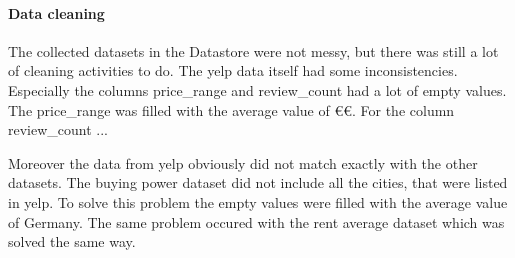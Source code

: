\paragraph{Data cleaning}
\label{subsec:Data cleaning}
The collected datasets in the Datastore were not messy, but there was still a lot of cleaning activities to do. The yelp data itself had some inconsistencies. Especially the columns price\_range and review\_count had a lot of empty values. The price\_range was filled with the average value of \euro\euro. For the column review\_count ...%

Moreover the data from yelp obviously did not match exactly with the other datasets. The buying power dataset did not include all the cities, that were listed in yelp. To solve this problem the empty values were filled with the average value of Germany. The same problem occured with the rent average dataset which was solved the same way.
